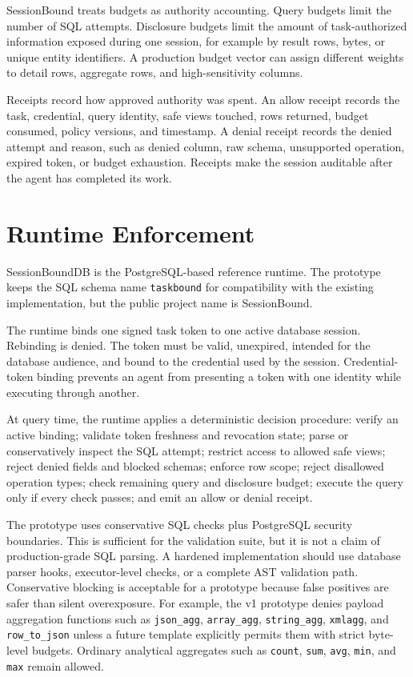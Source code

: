\documentclass[10pt,twocolumn]{article}
\begin{document}
SessionBound treats budgets as authority accounting. Query budgets limit
the number of SQL attempts. Disclosure budgets limit the amount of
task-authorized information exposed during one session, for example by
result rows, bytes, or unique entity identifiers. A production budget
vector can assign different weights to detail rows, aggregate rows, and
high-sensitivity columns.

Receipts record how approved authority was spent. An allow receipt
records the task, credential, query identity, safe views touched, rows
returned, budget consumed, policy versions, and timestamp. A denial
receipt records the denied attempt and reason, such as denied column,
raw schema, unsupported operation, expired token, or budget exhaustion.
Receipts make the session auditable after the agent has completed its
work.

\section{Runtime Enforcement}

SessionBoundDB is the PostgreSQL-based reference runtime. The prototype
keeps the SQL schema name \texttt{taskbound} for compatibility with the
existing implementation, but the public project name is SessionBound.

The runtime binds one signed task token to one active database session.
Rebinding is denied. The token must be valid, unexpired, intended for
the database audience, and bound to the credential used by the session.
Credential-token binding prevents an agent from presenting a token with
one identity while executing through another.

At query time, the runtime applies a deterministic decision procedure:
verify an active binding; validate token freshness and revocation
state; parse or conservatively inspect the SQL attempt; restrict access
to allowed safe views; reject denied fields and blocked schemas; enforce
row scope; reject disallowed operation types; check remaining query and
disclosure budget; execute the query only if every check passes; and
emit an allow or denial receipt.

The prototype uses conservative SQL checks plus PostgreSQL security
boundaries. This is sufficient for the validation suite, but it is not a
claim of production-grade SQL parsing. A hardened implementation should
use database parser hooks, executor-level checks, or a complete AST
validation path. Conservative blocking is acceptable for a prototype
because false positives are safer than silent overexposure. For example,
the v1 prototype denies payload aggregation functions such as
\texttt{json\_agg}, \texttt{array\_agg}, \texttt{string\_agg},
\texttt{xmlagg}, and \texttt{row\_to\_json} unless a future template
explicitly permits them with strict byte-level budgets. Ordinary
analytical aggregates such as \texttt{count}, \texttt{sum},
\texttt{avg}, \texttt{min}, and \texttt{max} remain allowed.
\end{document}
